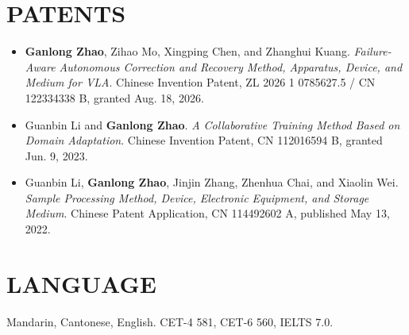 \documentclass[a4paper,9pt]{extarticle}
\newcommand{\me}{\textbf{Ganlong Zhao}}
\begin{document}
\section*{PATENTS}
\begin{itemize}[leftmargin=*, itemsep=1mm]
    \item \me, Zihao Mo, Xingping Chen, and Zhanghui Kuang. \textit{Failure-Aware Autonomous Correction and Recovery Method, Apparatus, Device, and Medium for VLA}. Chinese Invention Patent, ZL 2026 1 0785627.5 / CN 122334338 B, granted Aug. 18, 2026.
    \item Guanbin Li and \me. \textit{A Collaborative Training Method Based on Domain Adaptation}. Chinese Invention Patent, CN 112016594 B, granted Jun. 9, 2023.
    \item Guanbin Li, \me, Jinjin Zhang, Zhenhua Chai, and Xiaolin Wei. \textit{Sample Processing Method, Device, Electronic Equipment, and Storage Medium}. Chinese Patent Application, CN 114492602 A, published May 13, 2022.
\end{itemize}




\section*{LANGUAGE}

Mandarin, Cantonese, English.
CET-4 581, CET-6 560, IELTS 7.0.


\end{document}

